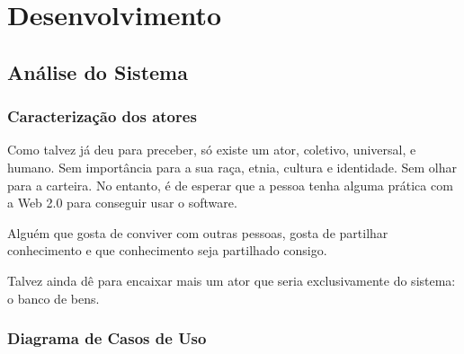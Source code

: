 \documentclass[12pt,a4paper,openright,oneside]{memoir}
\begin{document}
\chapter{Desenvolvimento}
\label{ch:dev}


\section{Análise do Sistema}
\label{ch:analysis}


\subsection{Caracterização dos atores}


Como talvez já deu para preceber, só existe um ator, coletivo, universal, e
humano. Sem importância para a sua raça, etnia, cultura e identidade. Sem olhar
para a carteira. No entanto, é de esperar que a pessoa tenha alguma prática com
a Web 2.0 para conseguir usar o software.

Alguém que gosta de conviver com outras pessoas, gosta de partilhar
conhecimento e que conhecimento seja partilhado consigo.

Talvez ainda dê para encaixar mais um ator que seria exclusivamente do sistema:
o banco de bens.

\subsection{Diagrama de Casos de Uso}
\end{document}
